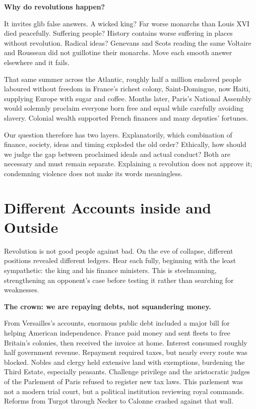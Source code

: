 \textbf{Why do revolutions happen?}

It invites glib false answers. A wicked king? Far worse monarchs than Louis XVI died peacefully. Suffering people? History contains worse suffering in places without revolution. Radical ideas? Genevans and Scots reading the same Voltaire and Rousseau did not guillotine their monarchs. Move each smooth answer elsewhere and it fails.

That same summer across the Atlantic, roughly half a million enslaved people laboured without freedom in France's richest colony, Saint-Domingue, now Haiti, supplying Europe with sugar and coffee. Months later, Paris's National Assembly would solemnly proclaim everyone born free and equal while carefully avoiding slavery. Colonial wealth supported French finances and many deputies' fortunes.

Our question therefore has two layers. Explanatorily, which combination of finance, society, ideas and timing exploded the old order? Ethically, how should we judge the gap between proclaimed ideals and actual conduct? Both are necessary and must remain separate. Explaining a revolution does not approve it; condemning violence does not make its words meaningless.

\section{Different Accounts inside and Outside}
Revolution is not good people against bad. On the eve of collapse, different positions revealed different ledgers. Hear each fully, beginning with the least sympathetic: the king and his finance ministers. This is steelmanning, strengthening an opponent's case before testing it rather than searching for weaknesses.

\textbf{The crown: we are repaying debts, not squandering money.}

From Versailles's accounts, enormous public debt included a major bill for helping American independence. France paid money and sent fleets to free Britain's colonies, then received the invoice at home. Interest consumed roughly half government revenue. Repayment required taxes, but nearly every route was blocked. Nobles and clergy held extensive land with exemptions, burdening the Third Estate, especially peasants. Challenge privilege and the aristocratic judges of the Parlement of Paris refused to register new tax laws. This parlement was not a modern trial court, but a political institution reviewing royal commands. Reforms from Turgot through Necker to Calonne crashed against that wall.

